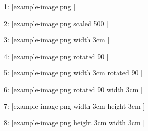 \documentclass{article}
\begin{document}
1: [\XeTeXpicfile example-image.png ]


2: [\XeTeXpicfile example-image.png  scaled 500 ]


3: [\XeTeXpicfile example-image.png  width 3cm ]


4: [\XeTeXpicfile example-image.png  rotated 90 ]

\clearpage

5: [\XeTeXpicfile example-image.png  width 3cm rotated 90 ]

6: [\XeTeXpicfile example-image.png  rotated 90 width 3cm ]

\clearpage

7: [\XeTeXpicfile example-image.png  width 3cm height 3cm ]

8: [\XeTeXpicfile example-image.png  height 3cm width 3cm ]
\end{document}
